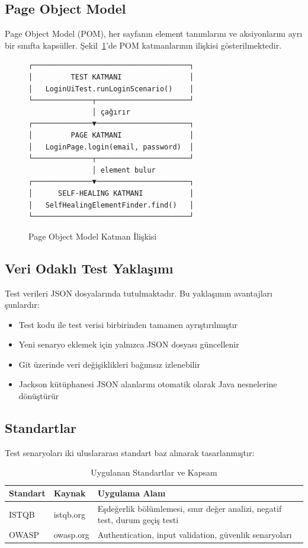 \subsection{Page Object Model}
Page Object Model (POM), her sayfanın element tanımlarını ve aksiyonlarını ayrı bir sınıfta kapsüller. Şekil~\ref{fig:pom}'de POM katmanlarının ilişkisi gösterilmektedir.

\begin{figure}[H]
\centering
\small
\begin{verbatim}
┌─────────────────────────────────────┐
│         TEST KATMANI                │
│   LoginUiTest.runLoginScenario()    │
└──────────────┬──────────────────────┘
               │ çağırır
┌──────────────▼──────────────────────┐
│         PAGE KATMANI                │
│   LoginPage.login(email, password)  │
└──────────────┬──────────────────────┘
               │ element bulur
┌──────────────▼──────────────────────┐
│      SELF-HEALING KATMANI           │
│   SelfHealingElementFinder.find()   │
└─────────────────────────────────────┘
\end{verbatim}
\caption{Page Object Model Katman İlişkisi}
\label{fig:pom}
\end{figure}

\subsection{Veri Odaklı Test Yaklaşımı}
Test verileri JSON dosyalarında tutulmaktadır. Bu yaklaşımın avantajları şunlardır:
\begin{itemize}
    \item Test kodu ile test verisi birbirinden tamamen ayrıştırılmıştır
    \item Yeni senaryo eklemek için yalnızca JSON dosyası güncellenir
    \item Git üzerinde veri değişiklikleri bağımsız izlenebilir
    \item Jackson kütüphanesi JSON alanlarını otomatik olarak Java nesnelerine dönüştürür
\end{itemize}

\subsection{Standartlar}
Test senaryoları iki uluslararası standart baz alınarak tasarlanmıştır:

\begin{table}[H]
\centering
\caption{Uygulanan Standartlar ve Kapsam}
\label{tab:standartlar}
\begin{tabular}{|l|l|p{4.8cm}|}
\hline
\textbf{Standart} & \textbf{Kaynak} & \textbf{Uygulama Alanı} \\
\hline
ISTQB & istqb.org & Eşdeğerlik bölümlemesi, sınır değer analizi, negatif test, durum geçiş testi \\
\hline
OWASP & owasp.org & Authentication, input validation, güvenlik senaryoları \\
\hline
\end{tabular}
\end{table}

